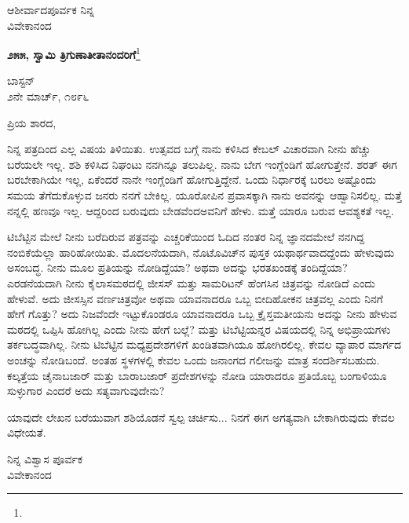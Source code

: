 {\flushright
ಆಶೀರ್ವಾದಪೂರ್ವಕ ನಿನ್ನ\\ವಿವೇಕಾನಂದ\par}

\begin{center}
\textbf{೨೫೫, ಸ್ವಾಮಿ ತ್ರಿಗುಣಾತೀತಾನಂದರಿಗೆ}\footnote{}
\end{center}

\vspace{-0.75cm}

\begin{flushright}
ಬಾಸ್ಟನ್\\೨ನೇ ಮಾರ್ಚ್, ೧೮೯೬
\end{flushright}

\vspace{-0.35cm}

\noindent
ಪ್ರಿಯ ಶಾರದ,

ನಿನ್ನ ಪತ್ರದಿಂದ ಎಲ್ಲ ವಿಷಯ ತಿಳಿಯಿತು. ಉತ್ಸವದ ಬಗ್ಗೆ ನಾನು ಕಳಿಸಿದ ಕೇಬಲ್ ವಿಚಾರವಾಗಿ ನೀನು ಹೆಚ್ಚು ಬರೆಯಲೇ ಇಲ್ಲ. ಶಶಿ ಕಳಿಸಿದ ನಿಘಂಟು ನನಗಿನ್ನೂ ತಲುಪಿಲ್ಲ. ನಾನು ಬೇಗ ಇಂಗ್ಲೆಂಡಿಗೆ ಹೋಗುತ್ತೇನೆ. ಶರತ್ ಈಗ ಬರಬೇಕಾಗಿಯೇ ಇಲ್ಲ, ಏಕೆಂದರೆ ನಾನೇ ಇಂಗ್ಲೆಂಡಿಗೆ ಹೋಗುತ್ತಿದ್ದೇನೆ. ಒಂದು ನಿರ್ಧಾರಕ್ಕೆ ಬರಲು ಅಷ್ಟೊಂದು ಸಮಯ ತೆಗೆದುಕೊಳ್ಳುವ ಜನರು ನನಗೆ ಬೇಕಿಲ್ಲ. ಯೂರೋಪಿನ ಪ್ರವಾಸಕ್ಕಾಗಿ ನಾನು ಅವನನ್ನು ಆಹ್ವಾನಿಸಲಿಲ್ಲ. ಮತ್ತೆ ನನ್ನಲ್ಲಿ ಹಣವೂ ಇಲ್ಲ. ಆದ್ದರಿಂದ ಬರುವುದು ಬೇಡವೆಂದ\break ಅವನಿಗೆ ಹೇಳು. ಮತ್ತೆ ಯಾರೂ ಬರುವ ಆವಶ್ಯಕತೆ ಇಲ್ಲ.

ಟಿಬೆಟ್ಟಿನ ಮೇಲೆ ನೀನು ಬರೆದಿರುವ ಪತ್ರವನ್ನು ಎಚ್ಚರಿಕೆಯಿಂದ ಓದಿದ ನಂತರ ನಿನ್ನ ಜ್ಞಾನದಮೇಲೆ ನನಗಿದ್ದ ನಂಬಿಕೆಯೆಲ್ಲಾ ಹಾರಿಹೋಯಿತು. ಮೊದಲನೆಯದಾಗಿ, ನೊಟೊವಿಚ್‌ನ ಪುಸ್ತಕ ಯಥಾರ್ಥವಾದದ್ದೆಂದು ಹೇಳುವುದು ಅಸಂಬದ್ಧ. ನೀನು ಮೂಲ ಪ್ರತಿಯನ್ನು ನೋಡಿದ್ದೆಯಾ? ಅಥವಾ ಅದನ್ನು ಭರತಖಂಡಕ್ಕೆ ತಂದಿದ್ದೆಯಾ? ಎರಡನೆಯದಾಗಿ ನೀನು ಕೈಲಾಸಮಠದಲ್ಲಿ ಜೀಸಸ್ ಮತ್ತು ಸಾಮರಿಟನ್ ಹೆಂಗಸಿನ ಚಿತ್ರವನ್ನು ನೋಡಿದೆ ಎಂದು ಹೇಳುವೆ. ಅದು ಜೀಸಸ್ಸಿನ ವರ್ಣಚಿತ್ರವೋ ಅಥವಾ ಯಾವನಾದರೂ ಒಬ್ಬ ಬೀದಿಹೋಕನ ಚಿತ್ರವಲ್ಲ ಎಂದು ನಿನಗೆ ಹೇಗೆ ಗೊತ್ತು? ಅದು ನಿಜವೆಂದೇ ಇಟ್ಟುಕೊಂಡರೂ ಯಾವನಾದರೂ ಒಬ್ಬ ಕ್ರೈಸ್ತಮತೀಯನು ಅದನ್ನು ನೀನು ಹೇಳುವ ಮಠದಲ್ಲಿ ಒಪ್ಪಿಸಿ ಹೋಗಿಲ್ಲ ಎಂದು ನೀನು ಹೇಗೆ ಬಲ್ಲೆ? ಮತ್ತು ಟಿಬೆಟ್ಟಿಯನ್ನರ ವಿಷಯದಲ್ಲಿ ನಿನ್ನ ಅಭಿಪ್ರಾಯಗಳು ತರ್ಕಬದ್ಧವಾಗಿಲ್ಲ. ನೀನು ಟಿಬೆಟ್ಟಿನ ಮಧ್ಯಪ್ರದೇಶಗಳಿಗೆ ಖಂಡಿತವಾಗಿಯೂ ಹೋಗಿರಲಿಲ್ಲ. ಕೇವಲ ವ್ಯಾಪಾರ ಮಾರ್ಗದ ಅಂಚನ್ನು ನೋಡಿಬಂದೆ. ಅಂತಹ ಸ್ಥಳಗಳಲ್ಲಿ ಕೇವಲ ಒಂದು ಜನಾಂಗದ ಗಲೀಜನ್ನು ಮಾತ್ರ ಸಂದರ್ಶಿಸಬಹುದು. ಕಲ್ಕತ್ತೆಯ ಚೈನಾಬಜಾರ್ ಮತ್ತು ಬಾರಾಬಜಾರ್ ಪ್ರದೇಶಗಳನ್ನು ನೋಡಿ ಯಾರಾದರೂ ಪ್ರತಿಯೊಬ್ಬ ಬಂಗಾಳಿಯೂ ಸುಳ್ಳುಗಾರ ಎಂದರೆ ಅದು ಸತ್ಯವಾಗುವುದೇನು?

ಯಾವುದೇ ಲೇಖನ ಬರೆಯುವಾಗ ಶಶಿಯೊಡನೆ ಸ್ವಲ್ಪ ಚರ್ಚಿಸು... ನಿನಗೆ ಈಗ ಅಗತ್ಯವಾಗಿ ಬೇಕಾಗಿರುವುದು ಕೇವಲ ವಿಧೇಯತೆ.

\vspace{-0.5cm}

{\flushright
ನಿನ್ನ ವಿಶ್ವಾಸ ಪೂರ್ವಕ\\ವಿವೇಕಾನಂದ\par}

